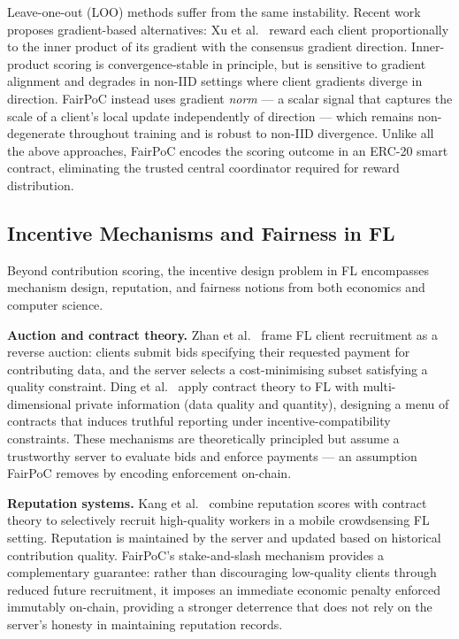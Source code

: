 \documentclass[journal]{IEEEtran}
\theoremstyle{definition}
\theoremstyle{remark}
\begin{document}
Leave-one-out (LOO) methods suffer from the same instability.
Recent work proposes gradient-based alternatives: Xu
et al.~\cite{gradient_driven_fairness2021} reward each client
proportionally to the inner product of its gradient with the
consensus gradient direction.
Inner-product scoring is convergence-stable in principle, but is
sensitive to gradient alignment and degrades in non-IID settings
where client gradients diverge in direction.
FairPoC instead uses gradient \emph{norm} --- a scalar signal
that captures the scale of a client's local update independently
of direction --- which remains non-degenerate throughout training
and is robust to non-IID divergence.
Unlike all the above approaches, FairPoC encodes the scoring
outcome in an ERC-20 smart contract, eliminating the trusted
central coordinator required for reward distribution.

\subsection{Incentive Mechanisms and Fairness in FL}

Beyond contribution scoring, the incentive design problem in FL
encompasses mechanism design, reputation, and fairness notions
from both economics and computer science.

\textbf{Auction and contract theory.}
Zhan et al.~\cite{zhan2021incentive} frame FL client recruitment
as a reverse auction: clients submit bids specifying their
requested payment for contributing data, and the server selects
a cost-minimising subset satisfying a quality constraint.
Ding et al.~\cite{ding2020optimal} apply contract theory to FL
with multi-dimensional private information (data quality and
quantity), designing a menu of contracts that induces truthful
reporting under incentive-compatibility constraints.
These mechanisms are theoretically principled but assume a
trustworthy server to evaluate bids and enforce payments ---
an assumption FairPoC removes by encoding enforcement on-chain.

\textbf{Reputation systems.}
Kang et al.~\cite{kang2019incentive} combine reputation scores
with contract theory to selectively recruit high-quality workers
in a mobile crowdsensing FL setting.
Reputation is maintained by the server and updated based on
historical contribution quality.
FairPoC's stake-and-slash mechanism provides a complementary
guarantee: rather than discouraging low-quality clients through
reduced future recruitment, it imposes an immediate economic
penalty enforced immutably on-chain, providing a stronger
deterrence that does not rely on the server's honesty in
maintaining reputation records.
\end{document}
